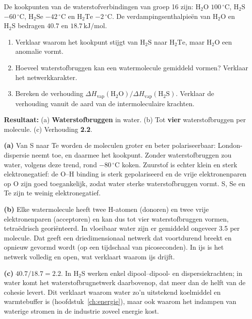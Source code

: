 \begin{oefening}
De kookpunten van de waterstofverbindingen van groep 16 zijn: \(\mathrm{H_2O}\) \(100\,^\circ\mathrm{C}\), \(\mathrm{H_2S}\) \(-60\,^\circ\mathrm{C}\), \(\mathrm{H_2Se}\) \(-42\,^\circ\mathrm{C}\) en \(\mathrm{H_2Te}\) \(-2\,^\circ\mathrm{C}\). De verdampingsenthalpieën van \(\mathrm{H_2O}\) en \(\mathrm{H_2S}\) bedragen \(40.7\) en \(18.7\,\mathrm{kJ/mol}\).

\begin{enumerate}
\item[(a)]
  Verklaar waarom het kookpunt stijgt van \(\mathrm{H_2S}\) naar \(\mathrm{H_2Te}\), maar \(\mathrm{H_2O}\) een anomalie vormt.
\item[(b)]
  Hoeveel waterstofbruggen kan een watermolecule gemiddeld vormen? Verklaar het netwerkkarakter.
\item[(c)]
  Bereken de verhouding \(\Delta H_{\text{vap}}(\mathrm{H_2O})/\Delta H_{\text{vap}}(\mathrm{H_2S})\). Verklaar de verhouding vanuit de aard van de intermoleculaire krachten.
\end{enumerate}
\end{oefening}
\begin{oplossing}
\textbf{Resultaat:} (a) \textbf{Waterstofbruggen} in water. (b) Tot \textbf{vier} waterstofbruggen per molecule. (c) Verhouding \textbf{2.2}.

\textbf{(a)} Van S naar Te worden de moleculen groter en beter polariseerbaar: London-dispersie neemt toe, en daarmee het kookpunt. Zonder waterstofbruggen zou water, volgens deze trend, rond \(-80\,^\circ\mathrm{C}\) koken. Zuurstof is echter klein en sterk elektronegatief: de O--H binding is sterk gepolariseerd en de vrije elektronenparen op O zijn goed toegankelijk, zodat water sterke waterstofbruggen vormt. S, Se en Te zijn te weinig elektronegatief.

\textbf{(b)} Elke watermolecule heeft twee H-atomen (donoren) en twee vrije elektronenparen (acceptoren) en kan dus tot vier waterstofbruggen vormen, tetraëdrisch georiënteerd. In vloeibaar water zijn er gemiddeld ongeveer 3.5 per molecule. Dat geeft een driedimensionaal netwerk dat voortdurend breekt en opnieuw gevormd wordt (op een tijdschaal van picoseconden). In ijs is het netwerk volledig en open, wat verklaart waarom ijs drijft.

\textbf{(c)} \(40.7/18.7 = 2.2\). In \(\mathrm{H_2S}\) werken enkel dipool--dipool- en dispersiekrachten; in water komt het waterstofbrugnetwerk daarbovenop, dat meer dan de helft van de cohesie levert. Dit verklaart waarom water zo'n uitstekend koelmiddel en warmtebuffer is (hoofdstuk~\ref{ch:energie}), maar ook waarom het indampen van waterige stromen in de industrie zoveel energie kost.
\end{oplossing}

